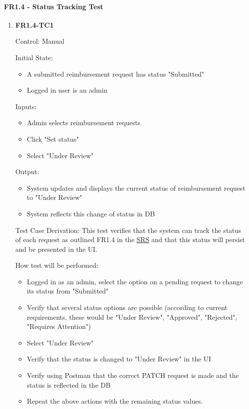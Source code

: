 \documentclass[12pt, titlepage]{article}
\begin{document}
\paragraph{FR1.4 - Status Tracking Test}

\begin{enumerate}
    \item{\textbf{FR1.4-TC1}}
    \hypertarget{FR1.4-TC1}{}
    
    Control: Manual
    
    Initial State:
    \begin{itemize}
        \item A submitted reimbursement request has status "Submitted"
        \item Logged in user is an admin
    \end{itemize}
    
    Inputs: 
    \begin{itemize}
        \item Admin selects reimbursement requests
        \item Click "Set status"
        \item Select "Under Review"
    \end{itemize}
    
    Output: 
    \begin{itemize}
        \item System updates and displays the current status of reimbursement request to "Under Review"
        \item System reflects this change of status in DB
    \end{itemize}
    
    Test Case Derivation: This test verifies that the system can track the status of each request as outlined FR1.4 in the \href{https://shorturl.at/FdAgR}{SRS} and that this status will persist and be presented in the UI.
    
    How test will be performed:
    \begin{itemize}
        \item Logged in as an admin, select the option on a pending request to change its status from "Submitted"
        \item Verify that several status options are possible (according to current requirements, these would be "Under Review", "Approved", "Rejected", "Requires Attention")
        \item Select "Under Review"
        \item Verify that the status is changed to "Under Review" in the UI
        \item Verify using Postman that the correct PATCH request is made and the status is reflected in the DB
        \item Repeat the above actions with the remaining status values.
    \end{itemize}
\end{enumerate}
\end{document}

